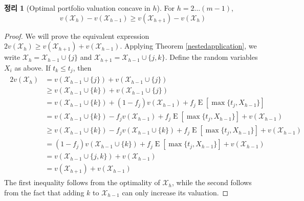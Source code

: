\documentclass[12pt]{article} %
\newtheorem{theorem}{Theorem}
\theoremstyle{definition}
\newtheorem{theorem}{정리}
\theoremstyle{definition}
\begin{document}
\begin{theorem}[Optimal portfolio valuation concave in $h$] \label{concavityinh}
For $h = 2 \dots (m-1)$, \begin{equation}v(\mathcal{X}_h) - v(\mathcal{X}_{h-1}) \geq v(\mathcal{X}_{h+1}) - v(\mathcal{X}_{h})\end{equation} 
\end{theorem}
\begin{proof}
We will prove the equivalent expression $2 v(\mathcal{X}_h) \geq v(\mathcal{X}_{h+1}) + v(\mathcal{X}_{h-1})$. Applying Theorem \ref{nestedapplication}, we write $\mathcal{X}_h = \mathcal{X}_{h-1} \cup\{j\}$ and $\mathcal{X}_{h+1} = \mathcal{X}_{h-1} \cup\{j, k\}$. Define the random variables $X_i$ as above. If $t_k \leq t_j$, then 
\begin{align}
\begin{split}
2 v(\mathcal{X}_h) &= v(\mathcal{X}_{h-1} \cup\{j\}) + v(\mathcal{X}_{h-1} \cup\{j\}) \\
&\geq v(\mathcal{X}_{h-1} \cup\{k\}) + v(\mathcal{X}_{h-1} \cup\{j\}) \\
&= v(\mathcal{X}_{h-1} \cup\{k\}) + (1 - f_j) v(\mathcal{X}_{h-1}) + f_j \operatorname{E}[\max\{t_j, X_{h-1}\}] \\
&= v(\mathcal{X}_{h-1} \cup\{k\}) - f_j v(\mathcal{X}_{h-1}) + f_j \operatorname{E}[\max\{t_j, X_{h-1}\}] + v(\mathcal{X}_{h-1})  \\
&\geq v(\mathcal{X}_{h-1} \cup\{k\})  - f_j v(\mathcal{X}_{h-1}\cup\{k\}) + f_j \operatorname{E}[\max\{t_j, X_{h-1}\}]+ v(\mathcal{X}_{h-1})\\
&= (1 - f_j) v(\mathcal{X}_{h-1} \cup\{k\})  + f_j \operatorname{E}[\max\{t_j, X_{h-1}\}]+ v(\mathcal{X}_{h-1})\\
&=  v(\mathcal{X}_{h-1} \cup\{j, k\}) + v(\mathcal{X}_{h-1})\\
&=  v(\mathcal{X}_{h+1}) + v(\mathcal{X}_{h-1})
\end{split} 
\end{align}
The first inequality follows from the optimality of $\mathcal{X}_h$, while the second follows from the fact that adding $k$ to $\mathcal{X}_{h-1}$ can only increase its valuation.


\end{proof}
\end{document}
